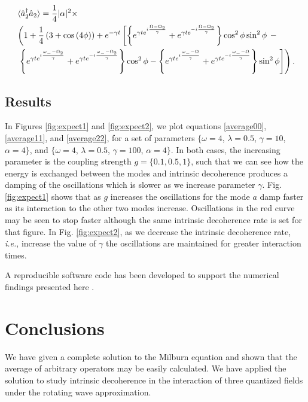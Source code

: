 \documentclass{article}
\newcommand{\op}[1]{\hat{#1}}
\begin{document}
\begin{equation}\label{average22}
\begin{aligned}
    &\braket{\op{a}_{2}^{\dagger}{\op{a}_{2}}} = \frac{1}{4}|\alpha|^{2}\times\\
    &\left(1 + \frac{1}{4}\left(3+\cos\left(4\phi\right)\right) + e^{-\gamma t}\left[\left\{e^{\gamma t e^{i\frac{\Omega-\Omega_{2}}{\gamma}}}+e^{\gamma t e^{-i\frac{\Omega-\Omega_{2}}{\gamma}}}\right\}\cos^{2}\phi\sin^{2}\phi\right.\right.-\\
    & \left.\left.\left\{e^{\gamma t e^{i\frac{\omega_{-}-\Omega_{2}}{\gamma}}}+e^{\gamma t e^{-i\frac{\omega_{-}-\Omega_{2}}{\gamma}}}\right\}\cos^{2}\phi - \left\{e^{\gamma t e^{i\frac{\omega_{-}-\Omega}{\gamma}}}+e^{\gamma t e^{-i\frac{\omega_{-}-\Omega}{\gamma}}}\right\}\sin^{2}\phi\right]\right).
\end{aligned}
\end{equation}

\newpage
\subsection{Results}\label{sec:results}
In Figures \ref{fig:expect1} and \ref{fig:expect2},  we plot equations \eqref{average00}, \eqref{average11}, and \eqref{average22}, for a set of parameters $\{\omega = 4$, $\lambda = 0.5$, $\gamma = 10$, $\alpha=4\}$, and $\{\omega = 4$, $\lambda = 0.5$, $\gamma = 100$, $\alpha=4\}$. In both cases, the increasing parameter is the coupling strength $g = \{0.1, 0.5, 1\}$, such that we can see how the energy is exchanged between the modes and intrinsic decoherence produces a damping of the oscillations which is slower as we increase parameter $\gamma$. Fig. \ref{fig:expect1} shows that as $g$ increases the oscillations for the mode $a$ damp faster as its interaction to the other two modes increase. Oscillations in the red curve may be seen to stop faster although the same intrinsic decoherence rate is set for that figure. In Fig. \ref{fig:expect2}, as we decrease the intrinsic decoherence rate, {\it i.e.}, increase the value of $\gamma$ the oscillations are maintained for greater interaction times.

A reproducible software code has been developed to support the numerical findings presented here \cite{alejandro_r_urzua_2021_5131447}. %

\section{Conclusions}\label{sec:concls}
We have given a complete solution to the Milburn equation and shown that the average of arbitrary operators may be easily calculated. We have applied the solution to study  intrinsic decoherence  in the interaction of three quantized fields under the rotating wave approximation.

\printbibliography
\end{document}
